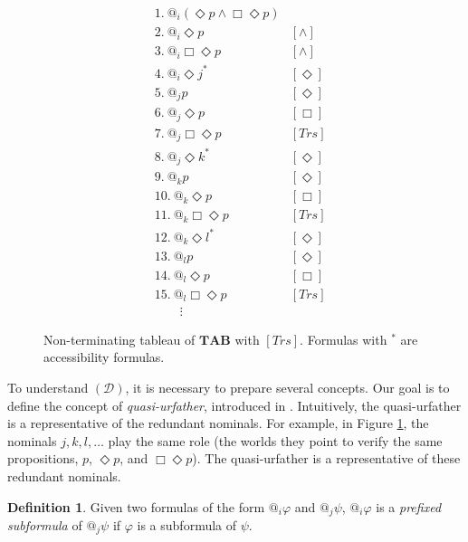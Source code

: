 \documentclass{article}
\theoremstyle{definition}
\newtheorem{definition}{Definition}[section]
\newcommand{\Dia}{\Diamond}
\newcommand{\tableau}{\mathbf{TAB}}
\newcommand{\Drest}{(\mathcal{D})}
\newcommand{\trans}{\mathit{Trs}}
\begin{document}
\begin{figure}[t]
  \begin{align*}
    &1. \ @_i (\Dia p \land \Box \Dia p) & \\
    &2. \ @_i \Dia p &[\land] \\
    &3. \ @_i \Box \Dia p &[\land] \\
    &4. \ {@_i \Dia j}^* &[\Dia] \\
    &5. \ @_j p &[\Dia] \\
    &6. \ @_j \Dia p &[\Box] \\
    &7. \ @_j \Box \Dia p &[\trans] \\
    &8. \ {@_j \Dia k}^* &[\Dia] \\
    &9. \ @_k p &[\Dia] \\ 
    &10. \ @_k \Dia p &[\Box] \\
    &11. \ @_k \Box \Dia p &[\trans] \\
    &12. \ {@_k \Dia l}^* &[\Dia] \\
    &13. \ @_l p &[\Dia] \\ 
    &14. \ @_l \Dia p &[\Box] \\
    &15. \ @_l \Box \Dia p &[\trans] \\
    &\qquad \vdots
  \end{align*}
  \caption{Non-terminating tableau of $\tableau$ with $[\trans]$. Formulas with ${}^*$ are accessibility formulas.}
  \label{figtabtrans}
\end{figure}

\vspace{\baselineskip}
To understand $\Drest$, it is necessary to prepare several concepts. Our goal is to define the concept of \emph{quasi-urfather}, introduced in \cite[\S 5.2]{bolander2007}. Intuitively, the quasi-urfather is a representative of the redundant nominals. For example, in Figure \ref{figtabtrans}, the nominals $j, k, l, \ldots$ play the same role (the worlds they point to verify the same propositions, $p$, $\Dia p$, and $\Box \Dia p$). The quasi-urfather is a representative of these redundant nominals.

\begin{definition}
  Given two formulas of the form $@_i \varphi$ and $@_j \psi$, $@_i \varphi$ is a \emph{prefixed subformula} of $@_j \psi$ if $\varphi$ is a subformula of $\psi$.
\end{definition}

\newpage
\end{document}

